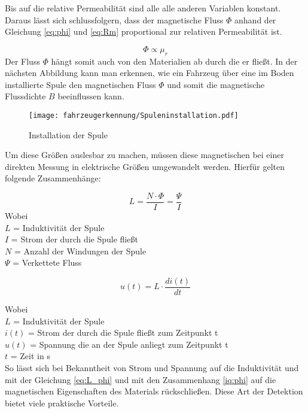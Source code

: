 Bis auf die relative Permeabilität sind alle alle anderen Variablen konstant. Daraus lässt sich schlussfolgern, dass der magnetische
Fluss $\Phi$ anhand der Gleichung \ref{eq:phi} und \ref{eq:Rm} proportional zur relativen Permeabilität ist. 

\begin{equation} \label{iq:phi}
    \Phi \propto \mu_{r}
\end{equation}
Der Fluss $\Phi$ hängt somit auch von den Materialien ab durch die er fließt. In der nächsten Abbildung kann man erkennen,
wie ein Fahrzeug über eine im Boden installierte Spule den magnetischen Fluss $\Phi$ und somit die magnetische Flussdichte $B$
beeinflussen kann. 

\begin{figure}[H]
    \centering
    \texttt{[image: fahrzeugerkennung/Spuleninstallation.pdf]}
    \caption{Installation der Spule}
  \end{figure}
Um diese Größen auslesbar zu machen, müssen diese magnetischen bei einer direkten Messung in elektrische Größen umgewandelt
werden.
Hierfür gelten folgende Zusammenhänge:

\begin{equation} \label{eq:L_phi}
    L = \frac{N \cdot \Phi}{I} = \frac{\Psi}{I} 
\end{equation}
Wobei \\
$L$ = Induktivität der Spule \\
$I$ = Strom der durch die Spule fließt \\
$N$ = Anzahl der Windungen der Spule \\
$\Psi$ = Verkettete Fluss

\pagebreak
\begin{equation} \label{eq:L_i}
    u(t) = L \cdot \frac{di(t)}{dt}
\end{equation}

Wobei \\
$L$ = Induktivität der Spule \\
$i(t)$ = Strom der durch die Spule fließt zum Zeitpunkt t \\
$u(t)$ = Spannung die an der Spule anliegt zum Zeitpunkt t \\
$t$ = Zeit in s \\
So lässt sich bei Bekanntheit von Strom und Spannung auf die Induktivität und mit der Gleichung \ref{eq:L_phi} 
und mit den Zusammenhang \ref{iq:phi} auf die magnetischen Eigenschaften des Materials rückschließen. 
Diese Art der Detektion bietet viele praktische Vorteile.

